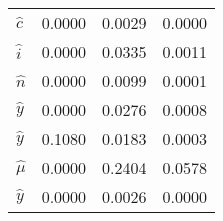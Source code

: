 \begin{center}
\begin{longtable}{lccc}
${\hat c}    $	 & 	       0.0000	 & 	       0.0029	 & 	       0.0000 \\ 
${\hat i}    $	 & 	       0.0000	 & 	       0.0335	 & 	       0.0011 \\ 
${\hat n}    $	 & 	       0.0000	 & 	       0.0099	 & 	       0.0001 \\ 
${\hat y}    $	 & 	       0.0000	 & 	       0.0276	 & 	       0.0008 \\ 
${\hat y}    $	 & 	       0.1080	 & 	       0.0183	 & 	       0.0003 \\ 
${\hat \mu}  $	 & 	       0.0000	 & 	       0.2404	 & 	       0.0578 \\ 
${\hat y}    $	 & 	       0.0000	 & 	       0.0026	 & 	       0.0000 \\ 
\end{longtable}
 \end{center}
